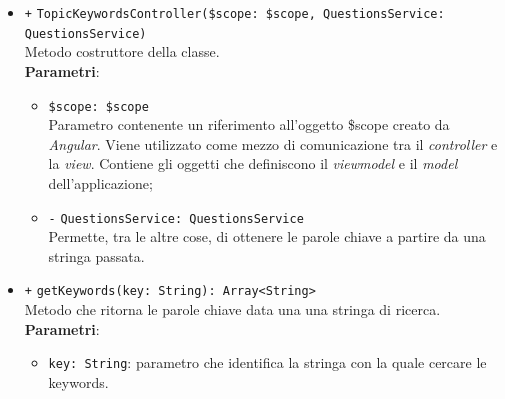 \begin{itemize}
\begin{itemize}
		\item \texttt{+} \texttt{TopicKeywordsController(\$scope: \$scope, QuestionsService:\\ QuestionsService)} \\Metodo costruttore della classe. \\
		\textbf{Parametri}:
		\begin{itemize}
			\item \texttt{\$scope: \$scope} \\
			Parametro contenente un riferimento all'oggetto \$scope creato da \textit{Angular}. Viene utilizzato come mezzo di comunicazione tra il \textit{controller} e la \textit{view}. Contiene gli oggetti che definiscono il \textit{viewmodel} e il \textit{model} dell'applicazione;
			\item \texttt{-} \texttt{QuestionsService: QuestionsService}\\ 
			Permette, tra le altre cose, di ottenere le parole chiave a partire da una stringa passata.
		\end{itemize}
		\item \texttt{+} \texttt{getKeywords(key: String): Array<String>}	 \\ Metodo che ritorna le parole chiave data una una stringa di ricerca. \\
	\textbf{Parametri}:
	\begin{itemize}
		\item \texttt{key: String}: parametro che identifica la stringa con la quale cercare le keywords. 
	\end{itemize}
		\end{itemize}
\end{itemize}